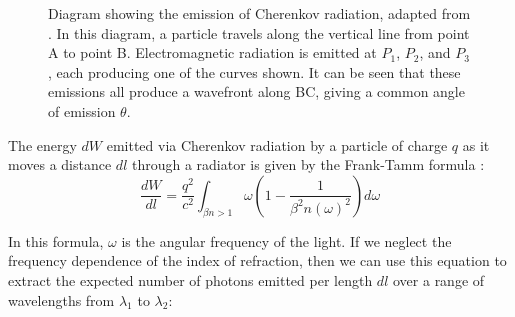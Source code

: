 \begin{figure}[]
\centering
{}
\caption[Diagram showing the emission of Cherenkov radiation]{Diagram showing the emission of Cherenkov radiation, adapted from \cite{cherenkov}.
In this diagram, a particle travels along the vertical line from point A to point B.
Electromagnetic radiation is emitted at $P_1$, $P_2$, and $P_3$, each producing one of the curves shown.
It can be seen that these emissions all produce a wavefront along BC, giving a common angle of emission $\theta$.}
\label{fig:cherenkov} 
\end{figure}

The energy $dW$ emitted via Cherenkov radiation by a particle of charge $q$ as it moves a distance $dl$ through a radiator is given by the Frank-Tamm formula \cite{frankTamm}:
\begin{equation}
    \label{eq:frankTamm}
    \frac{dW}{dl} = \frac{q^2}{c^2}\int_{\beta n > 1} \omega  \left(1 - \frac{1}{\beta^2n(\omega)^2}\right)d\omega
\end{equation}

In this formula, $\omega$ is the angular frequency of the light.
If we neglect the frequency dependence of the index of refraction, then we can use this equation to extract the expected number of photons emitted per length $dl$ over a range of wavelengths from $\lambda_1$ to $\lambda_2$:

